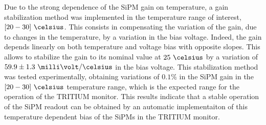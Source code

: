 \begin{enumerate}
\begin{enumerate}

Due to the strong dependence of the SiPM gain on temperature, a gain stabilization method was implemented in the temperature range of interest, $[20-30]~\celsius$. This consists in compensating the variation of the gain, due to changes in the temperature, by a variation in the bias voltage. Indeed, the gain depends linearly on both temperature and voltage bias with opposite slopes. This allows to stabilize the gain to its nominal value at $25~\celsius$ by a variation of $59.9 \pm 1.3 ~\milli\volt/\celsius$ in the bias voltage. This stabilization method was tested experimentally, obtaining variations of $0.1\%$ in the SiPM gain in the $[20-30]~\celsius$ temperature range, which is the expected range for the operation of the TRITIUM monitor. This results indicate that a stable operation of the SiPM readout can be obtained by an automatic implementaiton of this temperature dependent bias of the SiPMs in the TRITIUM monitor.


\end{enumerate}
\end{enumerate}
